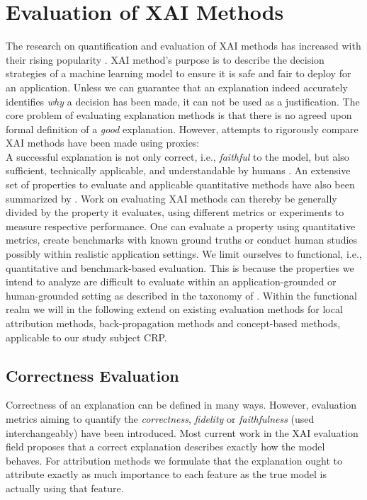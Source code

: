 \section{Evaluation of XAI Methods}
The research on quantification and evaluation of XAI methods has increased with their rising popularity \citep{Guidotti2018, Burkart2021}. 
XAI method's purpose is to describe the decision strategies of a machine learning model to ensure it is safe and fair to deploy for an application. 
Unless we can guarantee that an explanation indeed accurately identifies \textit{why} a decision has been made, it can not be used as a justification.
The core problem of evaluating explanation methods is that there is no agreed upon formal definition of a \textit{good} explanation. However, attempts to rigorously compare XAI methods have been made using proxies:\\
A successful explanation is not only correct, i.e., \textit{faithful} to the model, but also sufficient, technically applicable, and understandable by humans \citep{Samek2021}. An extensive set of properties to evaluate and applicable quantitative methods have also been summarized by \cite{Nauta2023}. Work on evaluating XAI methods can thereby be generally divided by the property it evaluates, using different metrics or experiments to measure respective performance. One can evaluate a property using quantitative metrics, create benchmarks with known ground truths or conduct human studies possibly within realistic application settings. We limit ourselves to functional, i.e., quantitative and benchmark-based evaluation. This is because the properties we intend to analyze are difficult to evaluate within an application-grounded or human-grounded setting as described in the taxonomy of \cite{Nauta2023}. Within the functional realm we will in the following extend on existing evaluation methods for local attribution methods, back-propagation methods and concept-based methods, applicable to our study subject CRP. 

\subsection{Correctness Evaluation}
Correctness of an explanation can be defined in many ways. However, evaluation metrics aiming to quantify the \textit{correctness}, \textit{fidelity} or \textit{faithfulness} (used interchangeably) have been introduced. Most current work in the XAI evaluation field proposes that a correct explanation describes exactly how the model behaves. For attribution methods we formulate that the explanation ought to attribute exactly as much importance to each feature as the true model is actually using that feature.

